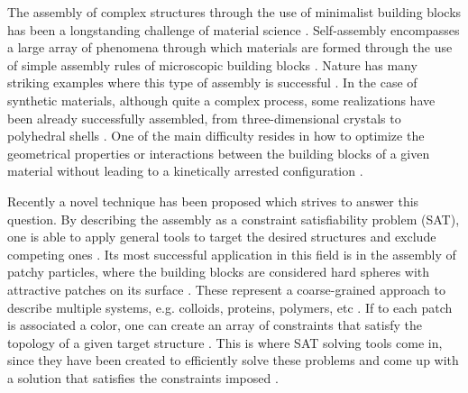 \documentclass[a4paper, amsfonts, amssymb, amsmath, reprint, showkeys, nofootinbib, twoside]{revtex4-1}
\begin{document}
The assembly of complex structures through the use of minimalist building blocks has been a longstanding challenge of material science \cite{Bishop2022}. Self-assembly encompasses a large array of phenomena through which materials are formed through the use of simple assembly rules of microscopic building blocks \cite{Whitelam2015}. Nature has many striking examples where this type of assembly is successful \cite{Whitesides2002, Parnell2015, Teyssier2015}. In the case of synthetic materials, although quite a complex process, some realizations have been already successfully assembled, from three-dimensional crystals to polyhedral shells \cite{Dziomkina2005, Glotzer2007, Kim2011, LaCour2022,  McGorty2010, Mu2022, Nykypanchuk2008, Sacanna2011, Wang2012, Wang2015, Joshi2016}. One of the main difficulty resides in how to optimize the geometrical properties or interactions between the building blocks of a given material without leading to a kinetically arrested configuration \cite{Frenkel2011, Lash2015, Blaaderen2006, Meulen2015}.

Recently a novel technique has been proposed which strives to answer this question. By describing the assembly as a constraint satisfiability problem (SAT), one is able to apply general tools to target the desired structures and exclude competing ones \cite{Romano2020a}. Its most successful application in this field is in the assembly of patchy particles, where the building blocks are considered hard spheres with attractive patches on its surface \cite{Bianchi2006, Romano2010, Rovigatti2018, Russo2021, Sciortino2009}. These represent a coarse-grained approach to describe multiple systems, e.g. colloids, proteins, polymers, etc \cite{Sacanna2011, Wang2012}. If to each patch is associated a color, one can create an array of constraints that satisfy the topology of a given target structure \cite{Russo2021a}. This is where SAT solving tools come in, since they have been created to efficiently solve these problems and come up with a solution that satisfies the constraints imposed \cite{Een2005}.
\end{document}
